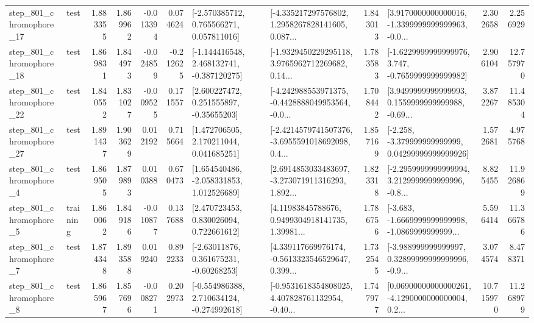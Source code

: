 \begin{tabular}{llrrrrllrlrr}
  step\_801\_chromophore\_17 &      test &      1.883355 &    1.869962 &     -0.013394 &  0.074624 &    [-2.570385712, 0.765566271, 0.057811016] &  [-4.335217297576802, 1.2958267828141605, 0.087... &       1.843013 &  [3.9170000000000016, -1.3399999999999963, -0.0... &            2.302658 &          2.256929 \\
  step\_801\_chromophore\_18 &      test &      1.869831 &    1.844973 &     -0.024859 & -0.212625 &   [-1.144416548, 2.468132741, -0.387120275] &  [-1.9329450229295118, 3.9765962712269682, 0.14... &       1.783583 &  [-1.6229999999999976, 3.747, -0.7659999999999982] &            2.906104 &         12.757970 \\
  step\_801\_chromophore\_22 &      test &      1.840552 &    1.831027 &     -0.009525 &  0.171557 &     [2.600227472, 0.251555897, -0.35655203] &  [-4.242988553971375, -0.4428888049953564, -0.0... &       1.708442 &  [3.9499999999999993, 0.1559999999999988, -0.69... &            3.872267 &         11.485304 \\
  step\_801\_chromophore\_27 &      test &      1.891437 &    1.903629 &      0.012192 &  0.715664 &     [1.472706505, 2.170211044, 0.041685251] &  [-2.4214579741507376, -3.6955591018692098, 0.4... &       1.857169 &  [-2.258, -3.379999999999999, 0.04299999999999926] &            1.572681 &          4.975768 \\
   step\_801\_chromophore\_4 &      test &      1.869505 &    1.879893 &      0.010388 &  0.670473 &    [1.654540486, -2.058331853, 1.012526689] &  [2.6914853033483697, -3.273071911316293, 1.892... &       1.823318 &  [-2.2959999999999994, 3.2129999999999996, -0.8... &            8.825455 &         11.926869 \\
   step\_801\_chromophore\_5 &  training &      1.860062 &    1.849186 &     -0.010877 &  0.137688 &     [2.470723453, 0.830026094, 0.722661612] &  [4.11983845788676, 0.9499304918141735, 1.39981... &       1.786756 &  [-3.683, -1.6669999999999998, -1.0869999999999... &            5.596414 &         11.366786 \\
   step\_801\_chromophore\_7 &      test &      1.874348 &    1.893588 &      0.019240 &  0.892233 &     [-2.63011876, 0.361675231, -0.60268253] &  [4.339117669976174, -0.5613323546529647, 0.399... &       1.732545 &  [-3.988999999999997, 0.32899999999999996, -0.9... &            3.074574 &          8.478371 \\
   step\_801\_chromophore\_8 &      test &      1.865967 &    1.857696 &     -0.008271 &  0.202973 &   [-0.554986388, 2.710634124, -0.274992618] &  [-0.9531618354808025, 4.407828761132954, -0.40... &       1.747977 &  [0.06900000000000261, -4.1290000000000004, 0.2... &           10.715970 &         11.268979 \\

\end{tabular}
